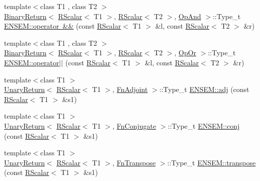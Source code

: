 \begin{DoxyCompactItemize}
{\footnotesize template$<$class T1 , class T2 $>$ }\\\mbox{\hyperlink{structENSEM_1_1BinaryReturn}{Binary\+Return}}$<$ \mbox{\hyperlink{classENSEM_1_1RScalar}{R\+Scalar}}$<$ T1 $>$, \mbox{\hyperlink{classENSEM_1_1RScalar}{R\+Scalar}}$<$ T2 $>$, \mbox{\hyperlink{structENSEM_1_1OpAnd}{Op\+And}} $>$\+::Type\+\_\+t \mbox{\hyperlink{group__rscalar_ga142a7a22c88f64f590411925c5c3cdcd}{E\+N\+S\+E\+M\+::operator \&\&}} (const \mbox{\hyperlink{classENSEM_1_1RScalar}{R\+Scalar}}$<$ T1 $>$ \&l, const \mbox{\hyperlink{classENSEM_1_1RScalar}{R\+Scalar}}$<$ T2 $>$ \&r)
\item 
{\footnotesize template$<$class T1 , class T2 $>$ }\\\mbox{\hyperlink{structENSEM_1_1BinaryReturn}{Binary\+Return}}$<$ \mbox{\hyperlink{classENSEM_1_1RScalar}{R\+Scalar}}$<$ T1 $>$, \mbox{\hyperlink{classENSEM_1_1RScalar}{R\+Scalar}}$<$ T2 $>$, \mbox{\hyperlink{structENSEM_1_1OpOr}{Op\+Or}} $>$\+::Type\+\_\+t \mbox{\hyperlink{group__rscalar_gad6b0ec6a8079826234d7bef5fa862c57}{E\+N\+S\+E\+M\+::operator$\vert$$\vert$}} (const \mbox{\hyperlink{classENSEM_1_1RScalar}{R\+Scalar}}$<$ T1 $>$ \&l, const \mbox{\hyperlink{classENSEM_1_1RScalar}{R\+Scalar}}$<$ T2 $>$ \&r)
\item 
{\footnotesize template$<$class T1 $>$ }\\\mbox{\hyperlink{structENSEM_1_1UnaryReturn}{Unary\+Return}}$<$ \mbox{\hyperlink{classENSEM_1_1RScalar}{R\+Scalar}}$<$ T1 $>$, \mbox{\hyperlink{structENSEM_1_1FnAdjoint}{Fn\+Adjoint}} $>$\+::Type\+\_\+t \mbox{\hyperlink{group__rscalar_ga7c3fdb23cffd473f858244b3284a9620}{E\+N\+S\+E\+M\+::adj}} (const \mbox{\hyperlink{classENSEM_1_1RScalar}{R\+Scalar}}$<$ T1 $>$ \&s1)
\item 
{\footnotesize template$<$class T1 $>$ }\\\mbox{\hyperlink{structENSEM_1_1UnaryReturn}{Unary\+Return}}$<$ \mbox{\hyperlink{classENSEM_1_1RScalar}{R\+Scalar}}$<$ T1 $>$, \mbox{\hyperlink{structENSEM_1_1FnConjugate}{Fn\+Conjugate}} $>$\+::Type\+\_\+t \mbox{\hyperlink{group__rscalar_ga24609fe5d05b5967e364924ef6d13929}{E\+N\+S\+E\+M\+::conj}} (const \mbox{\hyperlink{classENSEM_1_1RScalar}{R\+Scalar}}$<$ T1 $>$ \&s1)
\item 
{\footnotesize template$<$class T1 $>$ }\\\mbox{\hyperlink{structENSEM_1_1UnaryReturn}{Unary\+Return}}$<$ \mbox{\hyperlink{classENSEM_1_1RScalar}{R\+Scalar}}$<$ T1 $>$, \mbox{\hyperlink{structENSEM_1_1FnTranspose}{Fn\+Transpose}} $>$\+::Type\+\_\+t \mbox{\hyperlink{group__rscalar_ga0a32a83382be7e92236abd5dc654c18d}{E\+N\+S\+E\+M\+::transpose}} (const \mbox{\hyperlink{classENSEM_1_1RScalar}{R\+Scalar}}$<$ T1 $>$ \&s1)

\end{DoxyCompactItemize}
